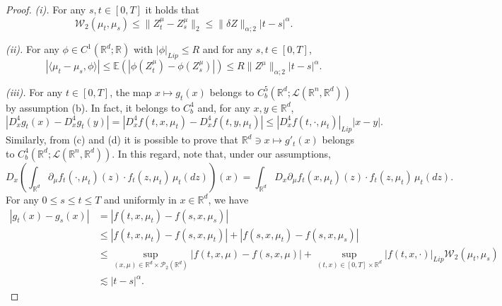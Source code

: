 \documentclass[10pt, a4paper]{article} %
\newcommand{\R}{\mathbb{R}}
\newcommand{\E}{\mathbb{E}}
\theoremstyle{definition}
\theoremstyle{plain}
\begin{document}
\begin{proof} \textit{(i). }  For any $s,t \in [0,T]$ it holds that \begin{equation*}
    \mathcal{W}_2(\mu_t, \mu_s) \le \|Z^\mu_t - Z^\mu_s\|_2 \le \|\delta Z\|_{\alpha;2} |t-s|^\alpha .
\end{equation*}


\textit{(ii). } For any $\phi \in C^1(\R^d;\R)$ with $|\phi|_{Lip} \le R$ and for any $s,t \in [0,T]$, \begin{equation*}
    |\langle \mu_t - \mu_s, \phi \rangle| \le \E (|\phi(Z^\mu_t) - \phi(Z^\mu_s)|) \le R \|Z^\mu\|_{\alpha;2} |t-s|^\alpha .
\end{equation*}


    \textit{(iii). } For any $t \in [0,T]$, the map $x \mapsto g_t(x)$ belongs to $C_b^5(\R^d;\mathscr{L}(\R^n,\R^d))$ by assumption (b). In fact, it belongs to $C_b^4$ and, for any $x,y \in \R^d$, \begin{equation*}
        |D^4_x g_t(x) - D^4_x g_t(y)| = |D^4_x f(t, x,\mu_t) - D^4_x f(t, y,\mu_t)| \le |D^4_x f(t,\cdot,\mu_t)|_{Lip} |x-y| .
    \end{equation*}
    Similarly, from (c) and (d) it is possible to prove that $\R^d \ni x \mapsto g'_t(x)$ belongs to $C_b^4(\R^d;\mathscr{L}(\R^n,\R^d))$. 
    In this regard, note that, under our assumptions, \begin{equation*}
        D_x \left(\int_{\R^d} \partial_\mu f_t (\cdot,\mu_t) (z) \cdot f_t(z,\mu_t) \, \mu_t(dz)\right)(x) =\int_{\R^d} D_x \partial_\mu f_t (x,\mu_t) (z) \cdot f_t(z,\mu_t) \, \mu_t(dz) .
    \end{equation*}
    For any $0 \le s \le t \le T$ and uniformly in $x \in \R^d$, we have \begin{equation*}
        \begin{split}
            |g_t(x) - g_s(x)| &= |f(t, x,\mu_t) - f(s, x,\mu_s)| \\
             &\le |f(t, x,\mu_t) - f(s, x,\mu_t)| + |f(s, x,\mu_t) - f(s, x,\mu_s)| \\
             & \le \sup_{(x,\mu) \in \R^d \times \mathcal{P}_2(\R^d)} |f(t, x,\mu) - f(s, x,\mu)| + \sup_{(t,x) \in [0,T] \times \R^d}|f(t,x,\cdot)|_{Lip} \mathcal{W}_2(\mu_t,\mu_s) \\
             &\lesssim |t-s|^\alpha .
        \end{split}
    \end{equation*}

\end{proof}
\end{document}
